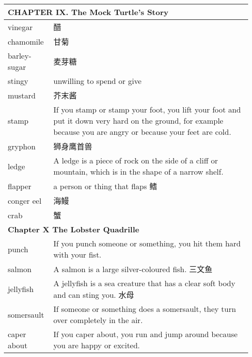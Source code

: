 \documentclass{article}
\begin{document}
\begin{center}
\begin{longtable}{|l|p{9cm}|}
\hline
\multicolumn{2}{|l|}{\textbf{CHAPTER IX. The Mock Turtle’s Story}}\\

\hline
vinegar
&
醋
\\

\hline
chamomile
&
甘菊
\\

\hline
barley-sugar
&
麦芽糖
\\

\hline
stingy
&
unwilling to spend or give
\\

\hline
mustard
&
芥末酱
\\

\hline
stamp
&
If you stamp or stamp your foot, you lift your foot and put it down very hard on the ground, for example because you are angry or because your feet are cold.
\\

\hline
gryphon
&
狮身鹰首兽
\\

\hline
ledge
&
A ledge is a piece of rock on the side of a cliff or mountain, which is in the shape of a narrow shelf.
\\

\hline
flapper
&
a person or thing that flaps 鳍
\\

\hline
conger eel
&
海鳗
\\

\hline
crab
&
蟹
\\

\hline
\multicolumn{2}{|l|}{\textbf{Chapter X The Lobster Quadrille}}\\

\hline
punch
&
If you punch someone or something, you hit them hard with your fist.
\\

\hline
salmon
&
A salmon is a large silver-coloured fish. 三文鱼
\\

\hline
jellyfish
&
A jellyfish is a sea creature that has a clear soft body and can sting you. 水母
\\

\hline
somersault
&
If someone or something does a somersault, they turn over completely in the air.
\\

\hline
caper about
&
If you caper about, you run and jump around because you are happy or excited.
\\


\end{longtable}
\end{center}
\end{document}
